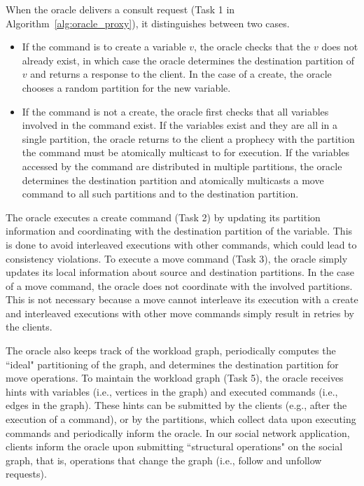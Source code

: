 When the oracle delivers a consult request (Task 1 in Algorithm~\ref{alg:oracle_proxy}), it distinguishes between two cases.
\begin{itemize}
\item If the command is to create a variable $v$, the oracle checks that the $v$ does not already exist, in which case the oracle determines the destination partition of $v$ and returns a response to the client.
In the case of a create, the oracle chooses a random partition for the new variable.
\item If the command is not a create, the oracle first checks that all variables involved in the command exist.
If the variables exist and they are all in a single partition, the oracle returns to the client a prophecy with the partition the command must be atomically multicast to for execution.
If the variables accessed by the command are distributed in multiple partitions, the oracle determines the destination partition and atomically multicasts a move command to all such partitions and to the destination partition.
\end{itemize}

The oracle executes a create command (Task 2) by updating its partition information and coordinating with the destination partition of the variable.
This is done to avoid interleaved executions with other commands, which could lead to consistency violations. 
To execute a move command (Task 3), the oracle simply updates its local information about source and destination partitions.
In the case of a move command, the oracle does not coordinate with the involved partitions.
This is not necessary because a move cannot interleave its execution with a create and interleaved executions with other move commands simply result in retries by the clients.

The oracle also keeps track of the workload graph, periodically computes the ``ideal" partitioning of the graph, and determines the destination partition for move operations.
To maintain the workload graph (Task 5), the oracle receives hints with variables (i.e., vertices in the graph) and executed commands (i.e., edges in the graph).
These hints can be submitted by the clients (e.g., after the execution of a command), or by the partitions, which collect data upon executing commands and periodically inform the oracle.
In our social network application, clients inform the oracle upon submitting ``structural operations" on the social graph, that is, operations that change the  graph (i.e., follow and unfollow requests).

